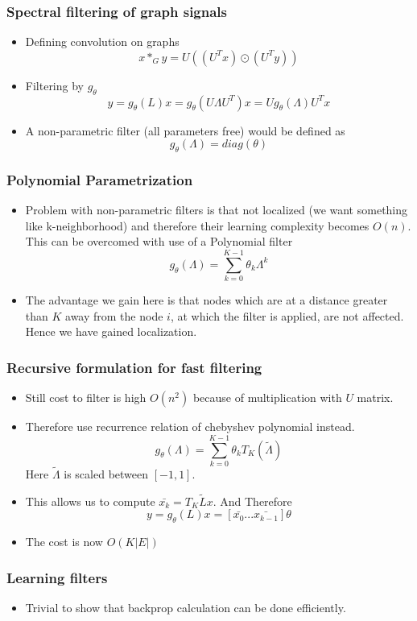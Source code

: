 \documentclass{beamer}
\begin{document}
\begin{frame}
  \frametitle{Spectral filtering of graph signals}
  \begin{itemize}
  \item Defining convolution on graphs
    $$ x *_{G} y = U((U^T x) \odot (U^T y))$$
  \item Filtering by $g_{\theta}$
    $$ y = g_{\theta}(L)x = g_{\theta}(U \Lambda U^{T})x = Ug_{\theta}(\Lambda) U^T x $$
  \item A non-parametric filter (all parameters free) would be defined as
    $$g_{\theta}(\Lambda) = diag(\theta)$$
  \end{itemize}
\end{frame}

\begin{frame}
  \frametitle{Polynomial Parametrization}
  \begin{itemize}
  \item   Problem with non-parametric filters is that not localized (we want something like k-neighborhood) and therefore their learning complexity becomes $O(n)$. This can be overcomed with use of a Polynomial filter
    $$g_{\theta}(\Lambda) = \sum_{k = 0}^{K-1}\theta_k\Lambda^k$$
  \item The advantage we gain here is that nodes which are at a distance greater than $K$ away from the node $i$, at which the filter is applied, are not affected. Hence we have gained localization.
  \end{itemize}
\end{frame}

\begin{frame}
  \frametitle{Recursive formulation for fast filtering}
  \begin{itemize}
  \item Still cost to filter is high $O(n^2)$ because of multiplication with $U$ matrix.
  \item Therefore use recurrence relation of chebyshev polynomial instead.
    $$g_{\theta}(\Lambda) = \sum_{k=0}^{K-1}\theta_k T_K(\tilde{\Lambda})$$
    Here $\tilde{\Lambda}$ is scaled between $[-1,1]$.
  \item This allows us to compute $\bar{x_k} = T_K{\tilde{L}}x$. And Therefore
    $$ y = g_{\theta}(L)x = [\bar{x_0}...\bar{x_{k-1}}]\theta$$
  \item The cost is now $O(K|E|)$
  \end{itemize}
\end{frame}

\begin{frame}
  \frametitle{Learning filters}
  \begin{itemize}
  \item Trivial to show that backprop calculation can be done efficiently.
  \end{itemize}
\end{frame}
\end{document}
